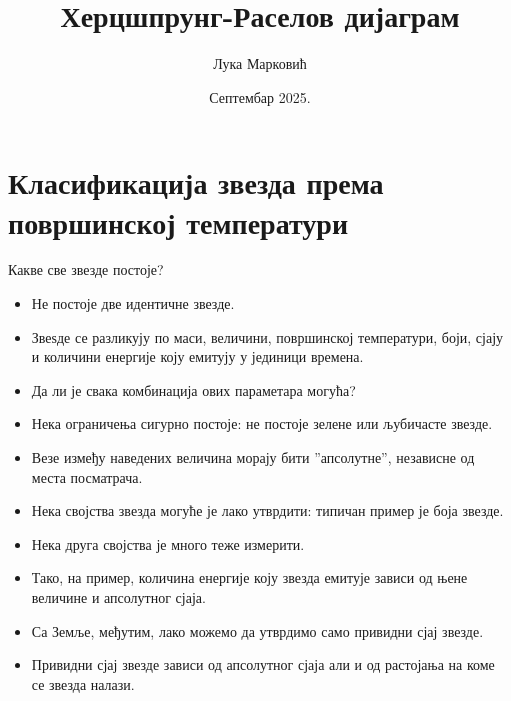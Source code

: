 \documentclass[aspectratio=169, xcolor=table, 10pt]{beamer}
\title{Херцшпрунг-Раселов дијаграм}
\author{Лука Марковић}
\institute[МАТФ]{Математички факултет Универзитета у Београду}
\date{Септембар 2025.}
\theoremstyle{definition}
\begin{document}
\maketitle

\section{Класификација звезда према површинској температури}

\begin{frame}{Какве све звезде постоје?}
  \begin{itemize}
    \item Не постоје две идентичне звезде.
    \item Звеѕде се разликују по маси, величини, површинској температури, боји, сјају и количини енергије коју емитују у јединици времена.
    \item Да ли је свака комбинација ових параметара могућа?
    \item Нека ограничења сигурно постоје: не постоје зелене или љубичасте звезде.
    \item Везе између наведених величина морају бити ”апсолутне”, независне од места посматрача.
    \item Нека својства звезда могуће је лако утврдити: типичан пример је боја звезде.
    \item Нека друга својства је много теже измерити.
    \item Тако, на пример, количина енергије коју звезда емитује зависи од њене величине и апсолутног сјаја.
    \item Са Земље, међутим, лако можемо да утврдимо само привидни сјај звезде.
    \item Привидни сјај звезде зависи од апсолутног сјаја али и од растојања на коме се звезда налази.
  \end{itemize}
\end{frame}
\end{document}
